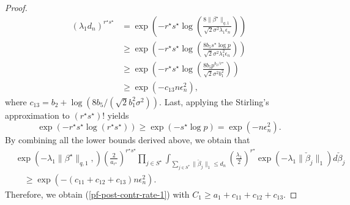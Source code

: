 \documentclass[pdftex, noinfoline, letter]{imsart}
\theoremstyle{plain}
\begin{document}
\begin{proof}
\begin{align*}
(\lambda_1 d_n)^{r^\star s^\star} & = 
\exp\left(-
r^\star s^\star \log \left(
\frac{8 \|\beta^\star\|_{q,1}}{\sqrt{2}\sigma^2 \lambda_1 \epsilon_n}
\right)
\right)\\
& \geq
\exp\left(- 
r^\star s^\star \log \left(
\frac{8 b_5 s^\star \log p}{\sqrt{2} \sigma^2 \lambda_1^2 \epsilon_n}
\right) \right)\\
& \geq 
\exp\left(-
r^\star s^\star \log \left(
\frac{8 b_5 p^{b_2/r^\star}}{\sqrt{2} \sigma^2 b_1^2}
\right)
\right)\\
& \geq 
\exp(- c_{13} n\epsilon_n^2),
\end{align*}
where $c_{13} = b_2 + \log(8b_5/(\sqrt{2}b_1^2\sigma^2))$.
Last, applying the Stirling's approximation to $(r^\star s^\star)!$ yields $$\exp(-r^\star s^\star \log (r^\star s^\star)) \geq \exp(-s^\star \log p) = \exp(-n\epsilon_n^2).$$
By combining all the lower bounds derived above, we obtain that
\begin{align*}
	& \exp\left(-\lambda_1 \|\beta^\star\|_{q,1}, \right)
	\left(\frac{2}{a_{r^\star}}\right)^{r^\star s^\star} 
	\prod_{j\in S^\star}
	\int_{\sum_{j \in S^\star} 
		\|\check{\beta}_j\|_1 \leq d_n}
	\left(\frac{\lambda_1}{2}\right)^{r^\star} 
	\exp(-\lambda_1 \|\check\beta_j\|_1) d \check\beta_j 
	\nonumber \\
	& \quad \geq \exp(- (c_{11} + c_{12} + c_{13}) n\epsilon_n^2).
\end{align*}
Therefore, we obtain (\ref{pf-post-contr-rate-1}) with $C_1 \geq a_1 + c_{11} + c_{12} + c_{13}$.


\end{proof}
\end{document}
